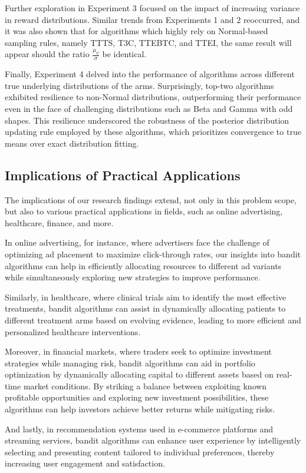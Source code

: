 \documentclass[a4paper, 12pt]{article}
\theoremstyle{definition}
\begin{document}
Further exploration in Experiment 3 focused on the impact of increasing variance in reward distributions. Similar trends from Experiments 1 and 2 reoccurred, and it was also shown that for algorithms which highly rely on Normal-based sampling rules, namely TTTS, T3C, TTEBTC, and TTEI, the same result will appear should the ratio $\frac{\mu_V}{\sigma}$ be identical.

Finally, Experiment 4 delved into the performance of algorithms across different true underlying distributions of the arms. Surprisingly, top-two algorithms exhibited resilience to non-Normal distributions, outperforming their performance even in the face of challenging distributions such as Beta and Gamma with odd shapes. This resilience underscored the robustness of the posterior distribution updating rule employed by these algorithms, which prioritizes convergence to true means over exact distribution fitting.


\subsection{Implications of Practical Applications}
The implications of our research findings extend, not only in this problem scope, but also to various practical applications in fields, such as online advertising, healthcare, finance, and more. 

In online advertising, for instance, where advertisers face the challenge of optimizing ad placement to maximize click-through rates, our insights into bandit algorithms can help in efficiently allocating resources to different ad variants while simultaneously exploring new strategies to improve performance. 

Similarly, in healthcare, where clinical trials aim to identify the most effective treatments, bandit algorithms can assist in dynamically allocating patients to different treatment arms based on evolving evidence, leading to more efficient and personalized healthcare interventions.

Moreover, in financial markets, where traders seek to optimize investment strategies while managing risk, bandit algorithms can aid in portfolio optimization by dynamically allocating capital to different assets based on real-time market conditions. By striking a balance between exploiting known profitable opportunities and exploring new investment possibilities, these algorithms can help investors achieve better returns while mitigating risks. 

And lastly, in recommendation systems used in e-commerce platforms and streaming services, bandit algorithms can enhance user experience by intelligently selecting and presenting content tailored to individual preferences, thereby increasing user engagement and satisfaction.
\end{document}
